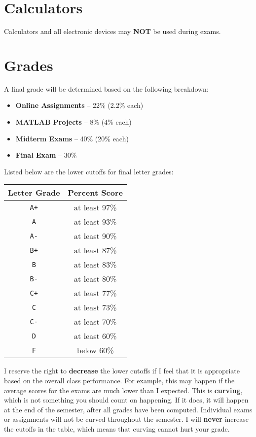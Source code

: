 \documentclass[a4paper,10pt]{article}
\begin{document}
\section{Calculators}
Calculators and all electronic devices may \textbf{NOT} be used during exams.

\section{Grades}
A final grade will be determined based on the following breakdown:
\begin{itemize}
\item \textbf{Online Assignments} – 22\% (2.2\% each)
\item \textbf{MATLAB Projects} – 8\% (4\% each)
\item \textbf{Midterm Exams} – 40\% (20\% each)
\item \textbf{Final Exam} – 30\%
\end{itemize}
Listed below are the lower cutoffs for final letter grades:
\begin{center}
\begin{tabular}{|c|c|}
\hline
Letter Grade & Percent Score\\
\hline
\texttt{A+} & at least 97\%\\
\hline
\texttt{A} & at least 93\%\\
\hline
\texttt{A-} & at least 90\%\\
\hline
\texttt{B+} & at least 87\%\\
\hline
\texttt{B} & at least 83\%\\
\hline
\texttt{B-} & at least 80\%\\
\hline
\texttt{C+} & at least 77\%\\
\hline
\texttt{C} & at least 73\%\\
\hline
\texttt{C-} & at least 70\%\\
\hline
\texttt{D} & at least 60\%\\
\hline
\texttt{F} & below 60\%\\
\hline
\end{tabular}
\end{center}
I reserve the right to \textbf{decrease} the lower cutoffs if I feel that it is appropriate based on the overall class performance. For example, this may happen if the average scores for the exams are much lower than I expected. This is \textbf{curving}, which is not something you should count on happening. If it does, it will happen at the end of the semester, after all grades have been computed. Individual exams or assignments will not be curved throughout the semester. I will \textbf{never} increase the cutoffs in the table, which means that curving cannot hurt your grade.
\end{document}
